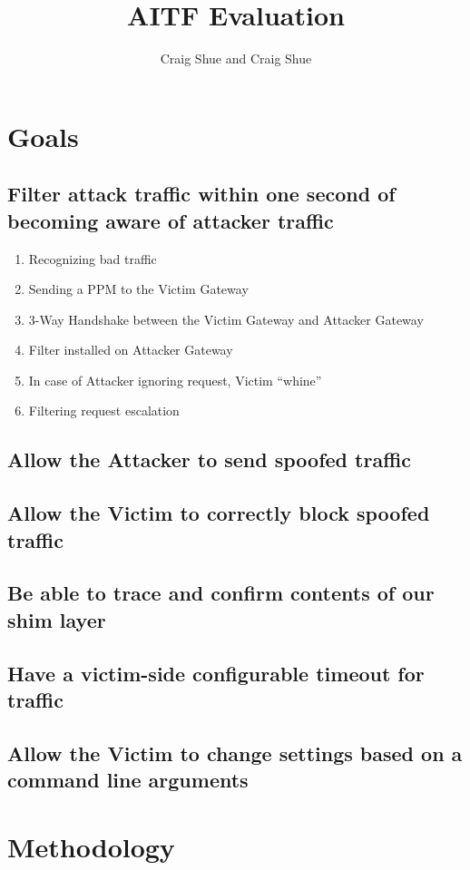 \documentclass[11pt]{article}
\title{\textbf{AITF Evaluation}}
\author{Craig Shue and Craig Shue}
\date{}
\begin{document}
\maketitle

\section{Goals}

	\subsection{Filter attack traffic within one second of becoming aware of attacker traffic}
		\begin{enumerate}
		\item{Recognizing bad traffic}
		\item{Sending a PPM to the Victim Gateway}
		\item{3-Way Handshake between the Victim Gateway and Attacker Gateway}
		\item{Filter installed on Attacker Gateway}
		\item{In case of Attacker ignoring request, Victim “whine”}
		\item{Filtering request escalation}
		\end{enumerate}
	\subsection{Allow the Attacker to send spoofed traffic}
	\subsection{Allow the Victim to correctly block spoofed traffic}
	\subsection{Be able to trace and confirm contents of our shim layer}
	\subsection{Have a victim-side configurable timeout for traffic}
	\subsection{Allow the Victim to change settings based on a command line arguments}

\newpage

\section{Methodology}
\end{document}
